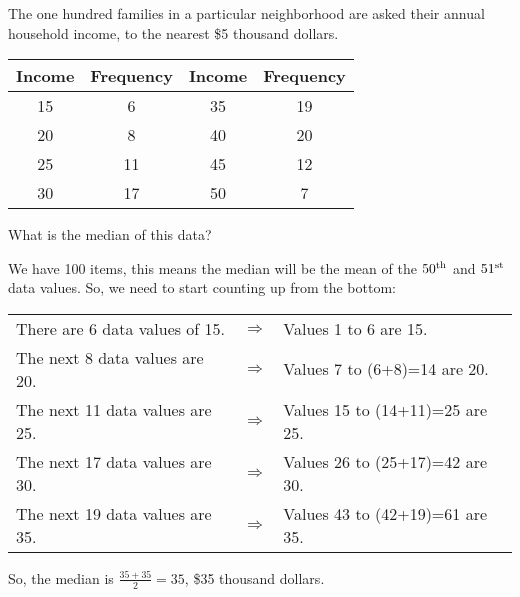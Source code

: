 \documentclass{beamer}
\begin{document}
\begin{frame}
\begin{example}
The one hundred families in a particular neighborhood are asked their annual household income, to the nearest \$5 thousand dollars. 

\vspace{-3mm}
\begin{center}
\begin{tabular}{|c|c||c|c|}
\hline
\textbf{Income} & \textbf{Frequency} & \textbf{Income} & \textbf{Frequency} \\\hline
15 &6 & 35 &19\\\hline
20 &8 & 40 &20\\\hline
25 &11 & 45 &12\\\hline
30 &17 & 50 &7\\\hline
\end{tabular}
\end{center}

\vspace{-3mm}
What is the median of this data?\pause

\vspace{1mm}
We have 100 items, this means the median will be the mean of the $50^{\small\text{th}}$ and $51^{\small\text{st}}$ data values. So, we need to start counting up from the bottom:\pause
\vspace{-6mm}
\begin{center}
\begin{tabular}{lcl}
There are 6 data values of 15. & $\Rightarrow$ & Values 1 to 6 are 15. \\\pause
The next 8 data values are 20. & $\Rightarrow$ & Values 7 to (6+8)=14 are 20. \\\pause
The next 11 data values are 25. & $\Rightarrow$ & Values 15 to (14+11)=25 are 25. \\\pause
The next 17 data values are 30. & $\Rightarrow$ & Values 26 to (25+17)=42 are 30. \\\pause
The next 19 data values are 35. & $\Rightarrow$ & Values 43 to (42+19)=61 are 35.
\end{tabular}
\end{center}\pause

\vspace{-2mm}
So, the median is $\frac{35+35}{2}=35$, \$35 thousand dollars.
\end{example}
\end{frame}
\end{document}
